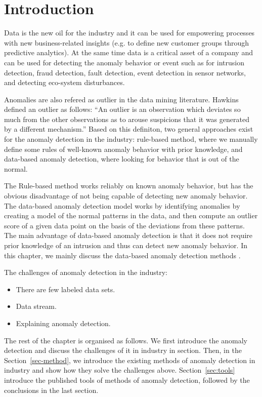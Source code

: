 \section{Introduction}\label{sec-intro}

Data is the new oil for the industry and
it can be used for empowering processes with
new business-related insights
(e.g. to define new customer groups through predictive analytics).
At the same time data is a critical asset of a company and
can be used for detecting the anomaly behavior or event
such as for
intrusion detection,
fraud detection,
fault detection,
event detection in sensor networks,
and detecting eco-system disturbances.

Anomalies are also refered as outlier in the 
data mining literature.
Hawkins~\cite{hawkins1980identification} defined
an outlier as follows:
``An outlier is an observation which 
deviates so much from the other observations
as to arouse suspicions that 
it was generated by a different mechanism.''
Based on this definiton, 
two general approaches exist for the anomaly 
detection in the industry: 
rule-based method, 
where we manually define some rules of  
well-known anomaly behavior
with prior knowledge, 
and data-based anomaly detection, 
where looking for behavior that
is out of the normal. 

The Rule-based method works reliably on known anomaly behavior, 
but has the obvious disadvantage of not being capable of 
detecting new anomaly behavior. 
The data-based anomaly detection model works by 
identifying anomalies by creating a model of 
the normal patterns in the data,
and then compute an outlier score of a given data point 
on the basis of the deviations from these patterns. 
The main advantage of data-based anomaly detection is that
it does not require prior knowledge of an intrusion and
thus can detect new anomaly behavior.
In this chapter,
we mainly discuss the data-based anomaly detection methods .


The challenges of anomaly detection in the industry:
\begin{itemize}
    \item There are few labeled data sets.
    \item Data stream.
    \item Explaining anomaly detection.
\end{itemize}

The rest of the chapter is organised as follows.
We first introduce the anomaly detection and
discuss the challenges of it in industry in section.
Then,
in the Section~\ref{sec-method},
we introduce the existing methods of anomaly detection in
industry and show how they solve the challenges above.
Section~\ref{sec:tools} introduce the published tools of
methods of anomaly detection,
followed by the conclusions in the last section.

